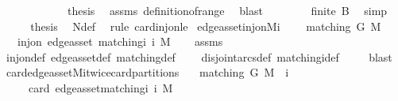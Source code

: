 \begin{isabellebody}
\ \ \ \ \isacommand{{\isacharbraceright}}\isamarkupfalse%
\isanewline
\ \ \ \ \isamarkupfalse%
\ \isamarkupfalse%
\ {\isacharquery}thesis\ \isamarkupfalse%
\ assms\ definition{\isacharunderscore}of{\isacharunderscore}range\ \isamarkupfalse%
\ blast\isanewline
\ \ \isamarkupfalse%
\isanewline
\ \ \isamarkupfalse%
\ \isamarkupfalse%
\ {\isachardoublequoteopen}finite\ {\isacharquery}B{\isachardoublequoteclose}\ \isamarkupfalse%
\ simp\isanewline
\ \ \isamarkupfalse%
\ \isamarkupfalse%
\ {\isacharquery}thesis\ \isamarkupfalse%
\ N{\isacharunderscore}def\ \isamarkupfalse%
\ {\isacharparenleft}rule\ card{\isacharunderscore}inj{\isacharunderscore}on{\isacharunderscore}le{\isacharparenright}\isanewline
{}\isamarkupfalse%
%
\endisatagproof
{\isafoldproof}%
%
\isadelimproof
\isanewline
%
\endisadelimproof
\isanewline
{}\isamarkupfalse%
\ edge{\isacharunderscore}as{\isacharunderscore}set{\isacharunderscore}inj{\isacharunderscore}on{\isacharunderscore}Mi{\isacharcolon}\ \isanewline
\ \ \ {\isachardoublequoteopen}matching\ G\ M{\isachardoublequoteclose}\isanewline
\ \ \ {\isachardoublequoteopen}inj{\isacharunderscore}on\ edge{\isacharunderscore}as{\isacharunderscore}set\ {\isacharparenleft}matching{\isacharunderscore}i\ i\ M{\isacharparenright}{\isachardoublequoteclose}\isanewline
%
\isadelimproof
\ \ %
\endisadelimproof
%
\isatagproof
{}\isamarkupfalse%
\ assms\isanewline
\ \ \isamarkupfalse%
\ inj{\isacharunderscore}on{\isacharunderscore}def\ edge{\isacharunderscore}as{\isacharunderscore}set{\isacharunderscore}def\ matching{\isacharunderscore}def\isanewline
\ \ \ \ disjoint{\isacharunderscore}arcs{\isacharunderscore}def\ matching{\isacharunderscore}i{\isacharunderscore}def\ \isanewline
\ \ \isamarkupfalse%
\ blast%
\endisatagproof
{\isafoldproof}%
%
\isadelimproof
\isanewline
%
\endisadelimproof
\isanewline
{}\isamarkupfalse%
\ card{\isacharunderscore}edge{\isacharunderscore}as{\isacharunderscore}set{\isacharunderscore}Mi{\isacharunderscore}twice{\isacharunderscore}card{\isacharunderscore}partitions{\isacharcolon}\isanewline
\ \ \ {\isachardoublequoteopen}matching\ G\ M\ {\isasymand}\ i\ {\isachargreater}\ {}{\isachardoublequoteclose}\isanewline
\ \ \ {\isachardoublequoteopen}{}\ {\isacharasterisk}\ card\ {\isacharparenleft}edge{\isacharunderscore}as{\isacharunderscore}set{\isacharbackquote}matching{\isacharunderscore}i\ i\ M{\isacharparenright}\ \isanewline

\end{isabellebody}

